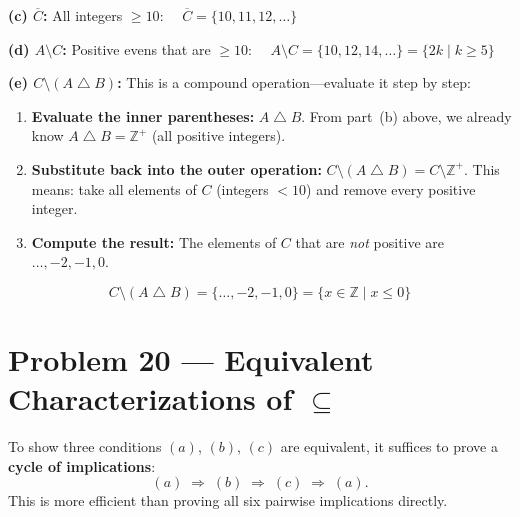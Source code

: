 \documentclass[12pt, a4paper]{article}
\newcommand{\Z}{\mathbb{Z}}
\newcommand{\comp}[1]{\overline{#1}}
\newcommand{\symdiff}{\mathbin{\triangle}}
\begin{document}
\textbf{(c)\; $\comp{C}$:}\;
All integers $\ge 10$:
$\quad\boxed{\comp{C} = \{10, 11, 12, \ldots\}}$

\textbf{(d)\; $A \setminus C$:}\;
Positive evens that are $\ge 10$:
$\quad\boxed{A \setminus C = \{10, 12, 14, \ldots\} = \{2k \mid k \ge 5\}}$

\textbf{(e)\; $C \setminus (A \symdiff B)$:}\;
This is a compound operation---evaluate it step by step:

\begin{enumerate}[label=\textbf{Step \arabic*:}, leftmargin=*, nosep, itemsep=4pt]
  \item \textbf{Evaluate the inner parentheses:}\;
        $A \symdiff B$. From part~(b) above, we already know
        $\boxed{A \symdiff B = \Z^+}$ (all positive integers).

  \item \textbf{Substitute back into the outer operation:}\;
        $C \setminus (A \symdiff B) = C \setminus \Z^+$.
        This means: take all elements of $C$ (integers $< 10$) and
        remove every positive integer.

  \item \textbf{Compute the result:}\;
        The elements of $C$ that are \emph{not} positive are
        $\ldots, -2, -1, 0$.
\end{enumerate}
\[
  \boxed{C \setminus (A \symdiff B) = \{\ldots, -2, -1, 0\}
         = \{x \in \Z \mid x \le 0\}}
\]

\newpage
\section{Problem 20 --- Equivalent Characterizations of $\subseteq$}

\begin{theorybox}
To show three conditions $(a)$, $(b)$, $(c)$ are equivalent, it suffices to prove
a \textbf{cycle of implications}:
\[
  (a) \;\Longrightarrow\; (b) \;\Longrightarrow\; (c) \;\Longrightarrow\; (a).
\]
This is more efficient than proving all six pairwise implications directly.

\begin{center}
\end{center}
\end{theorybox}
\end{document}
